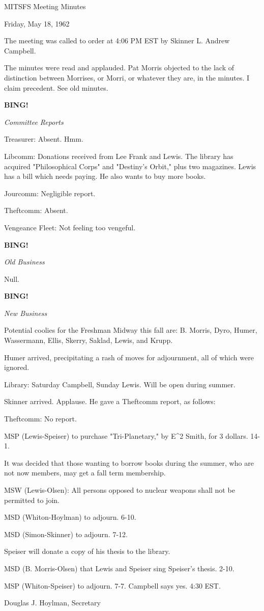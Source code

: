 \documentclass[12pt]{article}
\newcommand{\bing}{{\bf BING!} }
\newcommand{\goto}[1]{\bing \vskip 12pt \centerline{{\em{#1}}}}
\begin{document}
\begin{center}

MITSFS Meeting Minutes

Friday, May 18, 1962

\end{center}
 
\vspace{12pt}

\setlength{\parskip}{6pt}

\noindent
The meeting was called to order at 4:06 PM EST by Skinner L. Andrew Campbell.

The minutes were read and applauded. Pat Morris objected to the lack of distinction between Morrises, or Morri, or whatever they are, in the minutes. I claim precedent. See old minutes.

\goto{Committee Reports}

Treasurer: Absent. Hmm.

Libcomm: Donations received from Lee Frank and Lewis. The library has acquired "Philosophical Corps" and "Destiny's Orbit," plus two magazines. Lewis has a bill which needs paying. He also wants to buy more books.

Jourcomm: Negligible report.

Theftcomm: Absent.

Vengeance Fleet: Not feeling too vengeful.

\goto{Old Business}

Null.

\goto{New Business}

Potential coolies for the Freshman Midway this fall are: B. Morris, Dyro, Humer, Wassermann, Ellis, Skerry, Saklad, Lewis, and Krupp.

Humer arrived, precipitating a rash of moves for adjournment, all of which were ignored.

Library: Saturday Campbell, Sunday Lewis. Will be open during summer.

Skinner arrived. Applause. He gave a Theftcomm report, as follows:

Theftcomm: No report.

MSP (Lewis-Speiser) to purchase "Tri-Planetary," by E^2 Smith, for 3 dollars. 14-1.

It was decided that those wanting to borrow books during the summer, who are not now members, may get a fall term membership.

MSW (Lewis-Olsen): All persons opposed to nuclear weapons shall not be permitted to join.

MSD (Whiton-Hoylman) to adjourn. 6-10.

MSD (Simon-Skinner) to adjourn. 7-12.

Speiser will donate a copy of his thesis to the library.

MSD (B. Morris-Olsen) that Lewis and Speiser sing Speiser's thesis. 2-10.

MSP (Whiton-Speiser) to adjourn. 7-7. Campbell says yes. 4:30 EST.

\vspace{12pt}

\centerline{Douglas J. Hoylman, Secretary}
\end{document}

